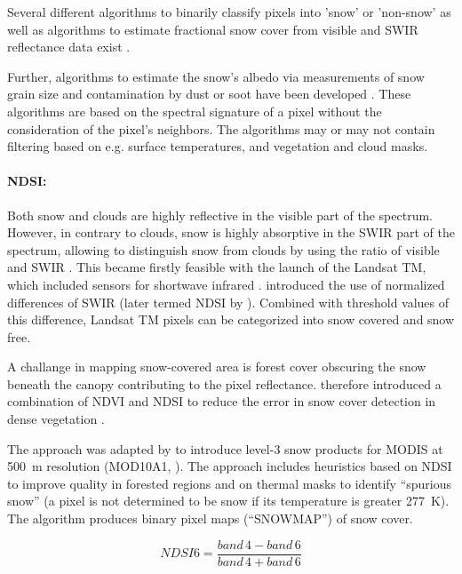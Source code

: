 \documentclass[letterpaper, parskip=half]{scrartcl}
\begin{document}
Several different algorithms to binarily classify pixels into 'snow' or 'non-snow' as well as algorithms to estimate fractional snow cover from visible and \gls{SWIR} reflectance data exist \citep{Nolin2010}.

Further, algorithms to estimate the snow's albedo via measurements of snow grain size and contamination by dust or soot have been developed \citep{Nolin2010, Dozier2004}. These algorithms are based on the spectral signature of a pixel without the consideration of the pixel's neighbors. The algorithms may or may not contain filtering based on e.g. surface temperatures, and vegetation and cloud masks.

\paragraph{\gls{NDSI}:}
Both snow and clouds are highly reflective in the visible part of the spectrum. However, in contrary to clouds, snow is highly absorptive in the \gls{SWIR} part of the spectrum, allowing to distinguish snow from clouds by using the ratio of visible and \gls{SWIR} \citep{Hall2011}. This became firstly feasible with the launch of the Landsat \gls{TM}, which included sensors for shortwave infrared \citep{Lettenmaier2015}. \cite{Dozier1989} introduced the use of normalized differences of \gls{SWIR} (later termed \gls{NDSI} by \cite{Hall1995}). Combined with threshold values of this difference, Landsat TM pixels can be categorized into snow covered and snow free.

A challange in mapping snow-covered area is forest cover obscuring the snow beneath the canopy contributing to the pixel reflectance. \cite{Klein1998} therefore introduced a combination of \gls{NDVI} and \gls{NDSI} to reduce the error in snow cover detection in dense vegetation \cite{Nolin2010}.
 
The approach was adapted by \cite{Hall2002, Hall2001} to introduce level-3 snow products for \gls{MODIS} at \SI{500}{\meter} resolution (MOD10A1, \citep{Hall2016}). The approach includes heuristics based on \gls{NDSI} to improve quality in forested regions and on thermal masks to identify ``spurious snow'' (a pixel is not determined to be snow if its temperature is greater \SI{277}{\kelvin}). The algorithm produces binary pixel maps (``SNOWMAP'') of snow cover.


\begin{equation}
 NDSI6 = \frac{band \, 4 -band \, 6}{band \, 4 + band \, 6}
\end{equation}
\end{document}
